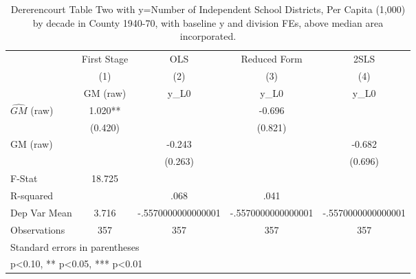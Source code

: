 \begin{table}[htbp]\centering
\def\sym#1{\ifmmode^{#1}\else\(^{#1}\)\fi}
\caption{Dererencourt Table Two with y=Number of Independent School Districts, Per Capita (1,000) by decade in County 1940-70, with baseline y and division FEs, above median area incorporated.}
\begin{tabular}{l*{4}{c}}
\toprule
                    & First Stage   &         OLS   &Reduced Form   &        2SLS   \\
                    &\multicolumn{1}{c}{(1)}&\multicolumn{1}{c}{(2)}&\multicolumn{1}{c}{(3)}&\multicolumn{1}{c}{(4)}\\
                    &\multicolumn{1}{c}{GM  (raw)}&\multicolumn{1}{c}{y\_L0}&\multicolumn{1}{c}{y\_L0}&\multicolumn{1}{c}{y\_L0}\\
\midrule
$\hat{GM}$ (raw)    &       1.020** &               &      -0.696   &               \\
                    &     (0.420)   &               &     (0.821)   &               \\
\addlinespace
GM  (raw)           &               &      -0.243   &               &      -0.682   \\
                    &               &     (0.263)   &               &     (0.696)   \\
\midrule
F-Stat              &      18.725   &               &               &               \\
R-squared           &               &        .068   &        .041   &               \\
Dep Var Mean        &       3.716   &-.5570000000000001   &-.5570000000000001   &-.5570000000000001   \\
Observations        &         357   &         357   &         357   &         357   \\
\bottomrule
\multicolumn{5}{l}{\footnotesize Standard errors in parentheses}\\
\multicolumn{5}{l}{\footnotesize * p<0.10, ** p<0.05, *** p<0.01}\\
\end{tabular}
\end{table}
